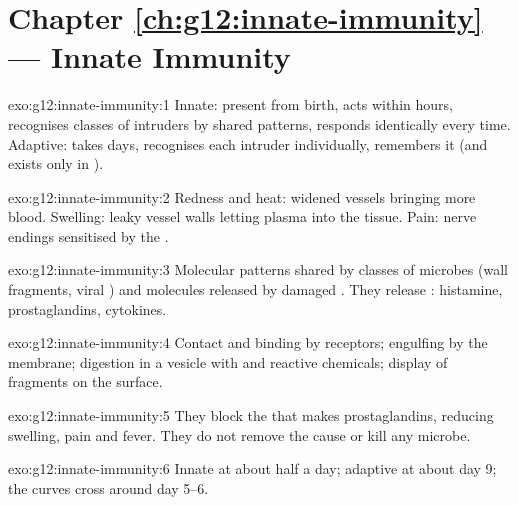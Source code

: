 \section*{Chapter \ref{ch:g12:innate-immunity} --- Innate Immunity}

\begin{solution}{exo:g12:innate-immunity:1}
Innate: present from birth, acts within hours, recognises classes of
intruders by shared patterns, responds identically every time. Adaptive:
takes days, recognises each intruder individually, remembers it (and
exists only in ).
\end{solution}

\begin{solution}{exo:g12:innate-immunity:2}
Redness and heat: widened vessels bringing more blood. Swelling: leaky
vessel walls letting plasma into the tissue. Pain: nerve endings
sensitised by the .
\end{solution}

\begin{solution}{exo:g12:innate-immunity:3}
Molecular patterns shared by classes of microbes (wall fragments,
viral ) and molecules released by damaged . They
release : histamine, prostaglandins, cytokines.
\end{solution}

\begin{solution}{exo:g12:innate-immunity:4}
Contact and binding by receptors; engulfing by the membrane; digestion
in a vesicle with  and reactive chemicals; display of 
fragments on the surface.
\end{solution}

\begin{solution}{exo:g12:innate-immunity:5}
They block the  that makes prostaglandins, reducing swelling,
pain and fever. They do not remove the cause or kill any microbe.
\end{solution}

\begin{solution}{exo:g12:innate-immunity:6}
Innate at about half a day; adaptive at about day 9; the curves cross
around day 5--6.
\end{solution}

